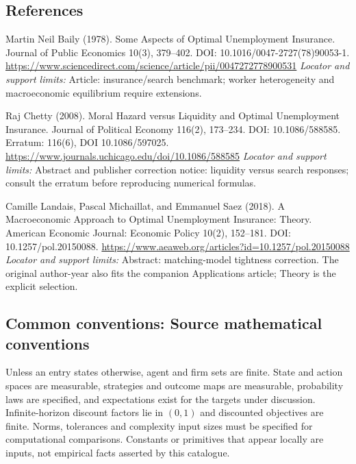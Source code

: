 \documentclass[11pt,a4paper]{article}
\begin{document}
\subsection*{References}
\begin{enumerate}[label={[S\arabic*]},leftmargin=*,itemsep=0.6em]
\item Martin Neil Baily (1978). Some Aspects of Optimal Unemployment Insurance. Journal of Public Economics 10(3), 379--402. DOI: 10.1016/0047-2727(78)90053-1.
\url{https://www.sciencedirect.com/science/article/pii/0047272778900531}
\newline\emph{Locator and support limits:} Article: insurance/search benchmark; worker heterogeneity and macroeconomic equilibrium require extensions.
\item Raj Chetty (2008). Moral Hazard versus Liquidity and Optimal Unemployment Insurance. Journal of Political Economy 116(2), 173--234. DOI: 10.1086/588585. Erratum: 116(6), DOI 10.1086/597025.
\url{https://www.journals.uchicago.edu/doi/10.1086/588585}
\newline\emph{Locator and support limits:} Abstract and publisher correction notice: liquidity versus search responses; consult the erratum before reproducing numerical formulas.
\item Camille Landais, Pascal Michaillat, and Emmanuel Saez (2018). A Macroeconomic Approach to Optimal Unemployment Insurance: Theory. American Economic Journal: Economic Policy 10(2), 152--181. DOI: 10.1257/pol.20150088.
\url{https://www.aeaweb.org/articles?id=10.1257/pol.20150088}
\newline\emph{Locator and support limits:} Abstract: matching-model tightness correction. The original author-year also fits the companion Applications article; Theory is the explicit selection.
\end{enumerate}

\subsection*{Common conventions: Source mathematical conventions}

Unless an entry states otherwise, agent and firm sets are finite. State and action spaces are measurable, strategies and outcome maps are measurable, probability laws are specified, and expectations exist for the targets under discussion. Infinite-horizon discount factors lie in $(0,1)$ and discounted objectives are finite. Norms, tolerances and complexity input sizes must be specified for computational comparisons. Constants or primitives that appear locally are inputs, not empirical facts asserted by this catalogue.
\end{document}
